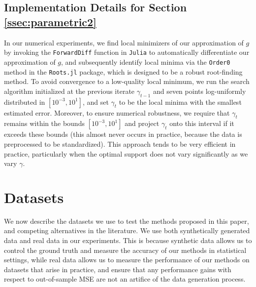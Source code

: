 \documentclass[mnsc,nonblindrev]{informs3} %
\begin{document}
\subsection{Implementation Details for Section \ref{ssec:parametric2}}\label{append.4.2}
In our numerical experiments, we find local minimizers of our approximation of $g$ by invoking the \verb|ForwardDiff| function in \verb|Julia| to automatically differentiate our approximation of $g$, and subsequently identify local minima via the \verb|Order0| method in the \verb|Roots.jl| package, which is designed to be a robust root-finding method. To avoid convergence to a low-quality local minimum, we run the search algorithm initialized at the previous iterate $\gamma_{t-1}$ and seven points log-uniformly distributed in $[10^{-3}, 10^{1}]$, and set $\gamma_t$ to be the local minima with the smallest estimated error. Moreover, to ensure numerical robustness, we require that $\gamma_t$ remains within the bounds $[10^{-3}, 10^1]$ and project $\gamma_t$ onto this interval if it exceeds these bounds (this almost never occurs in practice, because the data is preprocessed to be standardized). This approach tends to be very efficient in practice, particularly when the optimal support does not vary significantly as we vary $\gamma$. 


\section{Datasets}\label{sec:datasets}

We now describe the datasets we use to test the methods proposed in this paper, and competing alternatives in the literature. We use both synthetically generated data and real data in our experiments. This is because synthetic data allows us to control the ground truth and measure the accuracy of our methods in statistical settings, while real data allows us to measure the performance of our methods on datasets that arise in practice, and ensure that any performance gains with respect to out-of-sample MSE are not an artifice of the data generation process. 
\end{document}
